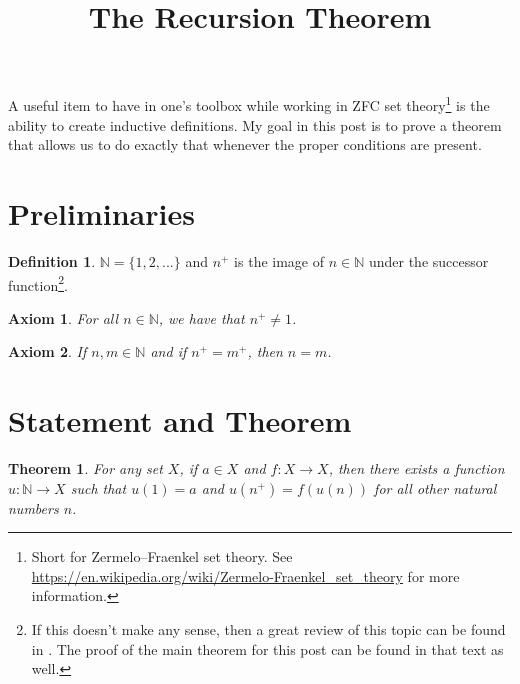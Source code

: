 \documentclass{article}
\title{The Recursion Theorem}
\author{}
\date{}
\theoremstyle{definition}
\newtheorem{definition}{Definition}[section]
\theoremstyle{definition}
\theoremstyle{plain}
\theoremstyle{remark}
\theoremstyle{plain}
\newtheorem{theorem}{Theorem}[section]
\theoremstyle{remark}
\theoremstyle{plain}
\theoremstyle{plain}
\newtheorem{axiom}{Axiom}[section]
\theoremstyle{plain}
\begin{document}
\maketitle

A useful item to have in one's toolbox while working in ZFC set 
theory\footnote{Short for Zermelo–Fraenkel set theory. See 
\url{https://en.wikipedia.org/wiki/Zermelo-Fraenkel_set_theory} for more 
information.} is the ability to create inductive definitions. My goal in this 
post is to prove a theorem that allows us to do exactly that whenever the 
proper conditions are present.

\section{Preliminaries}

\begin{definition}
  \( \mathbb{N} = \{1, 2, ... \} \) and \( n^{+} \) is the image of 
  \( n \in \mathbb{N} \) under the successor function\footnote{If this doesn't 
  make any sense, then a great review of this topic can be found in 
  \cite{naiiveSet}. The proof of the main theorem for this post can be found in 
  that text as well.}.
\end{definition}

\begin{axiom}
  For all \( n \in \mathbb{N} \), we have that \( n^{+} \neq 1 \). 
  \label{axiom:third_peano}
\end{axiom}

\begin{axiom}
  If \( n, m \in \mathbb{N}\) and if \( n^{+} = m^{+} \), then \( n = m \).
  \label{axiom:fourth_peano}
\end{axiom}

\section{Statement and Theorem}

\begin{theorem}
  For any set \( X \), if \( a \in X \) and \( f : X \rightarrow X \), then 
  there exists a function \( u: \mathbb{N} \rightarrow X \) such that 
  \( u(1) = a \) and \( u(n^{+}) = f(u(n)) \) for all other natural numbers 
  \( n \). 
  \label{recursion}
\end{theorem}
\end{document}
